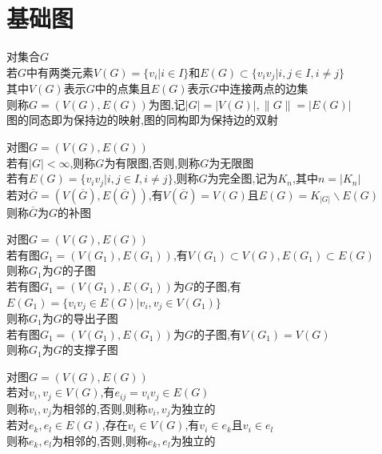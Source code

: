 

%

\setcounter{section}{0}
\setcounter{subsection}{0}

\chapter{基础图}

\begin{dingyi}
对集合$G$\\
若$G$中有两类元素$V(G)=\{v_i|i\in I\}$和$E(G)\subset \{v_iv_j|i,j\in I,i\neq j\}$\\
其中$V(G)$表示$G$中的点集且$E(G)$表示$G$中连接两点的边集\\
则称$G=(V(G),E(G))$为图,记$|G|=|V(G)|,\|G\|=|E(G)|$\\
图的同态即为保持边的映射,图的同构即为保持边的双射
\end{dingyi}

\begin{dingyi}
对图$G=(V(G),E(G))$\\
若有$|G|<\infty$,则称$G$为有限图,否则,则称$G$为无限图\\
若有$E(G)=\{v_iv_j|i,j\in I,i\neq j\}$,则称$G$为完全图,记为$K_{n}$,其中$n=|K_{n}|$\\
若对$\overline{G}=(V(\overline{G}),E(\overline{G}))$,有$V(\overline{G})=V(G)$且$E(G)=K_{|G|}\backslash E(G)$\\
则称$\overline{G}$为$G$的补图
\end{dingyi}

\begin{dingyi}
对图$G=(V(G),E(G))$\\
若有图$G_1=(V(G_1),E(G_1))$,有$V(G_1)\subset V(G),E(G_1)\subset E(G)$\\
则称$G_1$为$G$的子图\\
若有图$G_1=(V(G_1),E(G_1))$为$G$的子图,有$E(G_1)=\{v_iv_j\in E(G)|v_i,v_j\in V(G_1)\}$\\
则称$G_1$为$G$的导出子图\\
若有图$G_1=(V(G_1),E(G_1))$为$G$的子图,有$V(G_1)=V(G)$\\
则称$G_1$为$G$的支撑子图
\end{dingyi}

\begin{dingyi}
对图$G=(V(G),E(G))$\\
若对$v_i,v_j\in V(G)$,有$e_{ij}=v_iv_j\in E(G)$\\
则称$v_i,v_j$为相邻的,否则,则称$v_i,v_j$为独立的\\
若对$e_k,e_l\in E(G)$,存在$v_i\in V(G)$,有$v_i\in e_k$且$v_i\in e_{l}$\\
则称$e_k,e_l$为相邻的,否则,则称$e_k,e_l$为独立的
\end{dingyi}


